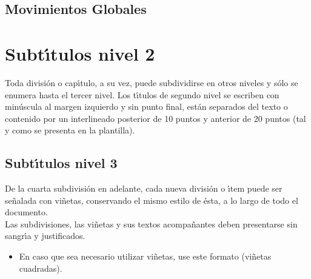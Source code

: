 \subsection{Movimientos Globales}

\section{Subt\'{\i}tulos nivel 2}
Toda divisi\'{o}n o cap\'{\i}tulo, a su vez, puede subdividirse en otros niveles y s\'{o}lo se enumera hasta el tercer nivel. Los t\'{\i}tulos de segundo nivel se escriben con min\'{u}scula al margen izquierdo y sin punto final, est\'{a}n separados del texto o contenido por un interlineado posterior de 10 puntos y anterior de 20 puntos (tal y como se presenta en la plantilla).\\

\subsection{Subt\'{\i}tulos nivel 3}
De la cuarta subdivisi\'{o}n en adelante, cada nueva divisi\'{o}n o \'{\i}tem puede ser se\~{n}alada con vi\~{n}etas, conservando el mismo estilo de \'{e}sta, a lo largo de todo el documento.\\

Las subdivisiones, las vi\~{n}etas y sus textos acompa\~{n}antes deben presentarse sin sangr\'{\i}a y justificados.\\

\begin{itemize}
\item En caso que sea necesario utilizar vi\~{n}etas, use este formato (vi\~{n}etas cuadradas).
\end{itemize}